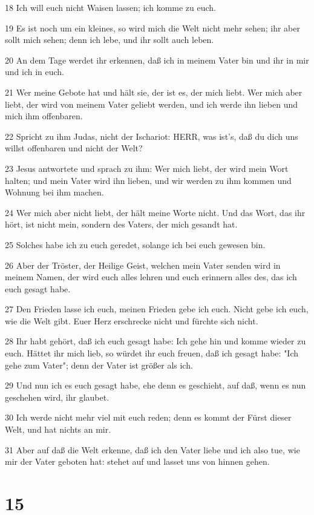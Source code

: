 \par 18 Ich will euch nicht Waisen lassen; ich komme zu euch.
\par 19 Es ist noch um ein kleines, so wird mich die Welt nicht mehr sehen; ihr aber sollt mich sehen; denn ich lebe, und ihr sollt auch leben.
\par 20 An dem Tage werdet ihr erkennen, daß ich in meinem Vater bin und ihr in mir und ich in euch.
\par 21 Wer meine Gebote hat und hält sie, der ist es, der mich liebt. Wer mich aber liebt, der wird von meinem Vater geliebt werden, und ich werde ihn lieben und mich ihm offenbaren.
\par 22 Spricht zu ihm Judas, nicht der Ischariot: HERR, was ist's, daß du dich uns willst offenbaren und nicht der Welt?
\par 23 Jesus antwortete und sprach zu ihm: Wer mich liebt, der wird mein Wort halten; und mein Vater wird ihn lieben, und wir werden zu ihm kommen und Wohnung bei ihm machen.
\par 24 Wer mich aber nicht liebt, der hält meine Worte nicht. Und das Wort, das ihr hört, ist nicht mein, sondern des Vaters, der mich gesandt hat.
\par 25 Solches habe ich zu euch geredet, solange ich bei euch gewesen bin.
\par 26 Aber der Tröster, der Heilige Geist, welchen mein Vater senden wird in meinem Namen, der wird euch alles lehren und euch erinnern alles des, das ich euch gesagt habe.
\par 27 Den Frieden lasse ich euch, meinen Frieden gebe ich euch. Nicht gebe ich euch, wie die Welt gibt. Euer Herz erschrecke nicht und fürchte sich nicht.
\par 28 Ihr habt gehört, daß ich euch gesagt habe: Ich gehe hin und komme wieder zu euch. Hättet ihr mich lieb, so würdet ihr euch freuen, daß ich gesagt habe: "Ich gehe zum Vater"; denn der Vater ist größer als ich.
\par 29 Und nun ich es euch gesagt habe, ehe denn es geschieht, auf daß, wenn es nun geschehen wird, ihr glaubet.
\par 30 Ich werde nicht mehr viel mit euch reden; denn es kommt der Fürst dieser Welt, und hat nichts an mir.
\par 31 Aber auf daß die Welt erkenne, daß ich den Vater liebe und ich also tue, wie mir der Vater geboten hat: stehet auf und lasset uns von hinnen gehen.

\chapter{15}

